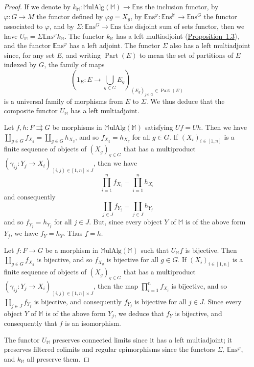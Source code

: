 \documentclass{article}
\newcommand{\bb}[1]{{\mathbb{#1}}}
\newcommand{\Set}{\mathbb{E}\mathrm{ns}}
\newcommand{\MulAlg}{\mathbb{M}\mathrm{ulAlg}}
\DeclareMathOperator{\Part}{Part}
\newcommand{\oldpage}[1]{\marginpar{\footnotesize$\Big\vert$ \textit{p.~#1}}}
\begin{document}
\begin{proof}
  If we denote by $k_\bb{M}\colon\MulAlg(\bb{M})\to\Set$ the inclusion functor, by $\varphi\colon G\to M$ the functor defined by $\varphi g=X_g$, by $\Set^\varphi\colon\Set^\bb{M}\to\Set^G$ the functor associated to $\varphi$, and by $\Sigma\colon\Set^G\to\Set$ the disjoint sum of sets functor, then we have $U_\bb{M}=\Sigma\Set^\varphi k_\bb{M}$.
  The functor $k_\bb{M}$ has a left multiadjoint (\hyperref[1.3]{Proposition~1.3}), and the functor $\Set^\varphi$ has a left adjoint.
  The functor $\Sigma$ also has a left multiadjoint since, for any set $E$, and writing $\Part(E)$ to mean the set of partitions of $E$ indexed by $G$, the family of maps
  \[
    \left(1_E\colon E\to\bigcup_{g\in G}E_g\right)_{(E_g)_{g\in G}\in\Part(E)}
  \]
  is a universal family of morphisms from $E$ to $\Sigma$.
  We thus deduce that the composite functor $U_\bb{M}$ has a left multiadjoint.

  Let $f,h\colon F\rightrightarrows G$ be morphisms in $\MulAlg(\bb{M})$ satisfying $Uf=Uh$.
  Then we have $\coprod_{g\in G}f_{X_g}=\coprod_{g\in G}h_{X_g}$, and so $f_{X_g}=h_{X_g}$ for all $g\in G$.
  If $(X_i)_{i\in[1,n]}$ is a finite sequence of objects of $(X_g)_{g\in G}$ that has a multiproduct $(\gamma_{ij}\colon Y_j\to X_i)_{(i,j)\in[1,n]\times J}$, then we have
  \[
    \prod_{i=1}^n f_{X_i} = \prod_{i=1}^n h_{X_i}
  \]
  and consequently
  \[
    \coprod_{j\in J} f_{Y_j} = \coprod_{j\in J} h_{Y_j}
  \]
  and so $f_{Y_j}=h_{Y_j}$ for all $j\in J$.
  But, since every object $Y$ of $\bb{M}$ is of the above form $Y_j$, we have $f_Y=h_Y$.
  Thus $f=h$.

\oldpage{200}
  Let $f\colon F\to G$ be a morphism in $\MulAlg(\bb{M})$ such that $U_\bb{M}f$ is bijective.
  Then $\coprod_{g\in G}f_{X_g}$ is bijective, and so $f_{X_g}$ is bijective for all $g\in G$.
  If $(X_i)_{i\in[1,n]}$ is a finite sequence of objects of $(X_g)_{g\in G}$ that has a multiproduct $(\gamma_{ij}\colon Y_j\to X_i)_{(i,j)\in[1,n]\times J}$, then the map $\prod_{i=1}^nf_{X_i}$ is bijective, and so $\coprod_{j\in J}f_{Y_j}$ is bijective, and consequently $f_{Y_j}$ is bijective for all $j\in J$.
  Since every object $Y$ of $\bb{M}$ is of the above form $Y_j$, we deduce that $f_Y$ is bijective, and consequently that $f$ is an isomorphism.

  The functor $U_\bb{M}$ preserves connected limits since it has a left multiadjoint; it preserves filtered colimits and regular epimorphisms since the functors $\Sigma$, $\Set^\varphi$, and $k_\bb{M}$ all preserve them.
\end{proof}
\end{document}
